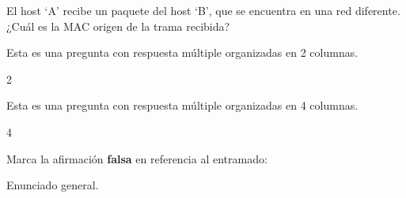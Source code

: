 \documentclass[english]{arco-exam}
\begin{document}
\begin{questions}
\begin{simpleQuestion}
  El host `A' recibe un paquete del host `B', que se encuentra en una red
    diferente. ¿Cuál es la MAC origen de la trama recibida?

\end{simpleQuestion}


\begin{simpleQuestion}
  Esta es una pregunta con respuesta múltiple organizadas en 2 columnas.

  \begin{multicols}{2}
  \end{multicols}
\end{simpleQuestion}



\begin{simpleQuestion}
  Esta es una pregunta con respuesta múltiple organizadas en 4 columnas.

  \begin{multicols}{4}
    \mbox{}
    \mbox{}
    \mbox{}
    \mbox{}
  \end{multicols}

\end{simpleQuestion}


\begin{simpleQuestion}[1]
  Marca la afirmación \textbf{falsa} en referencia al entramado:

\end{simpleQuestion}


  \begin{multiQuestion}[12]
    \begin{questionStatement}
    Enunciado general.
    \end{questionStatement}


\end{multiQuestion}
\end{questions}
\end{document}
